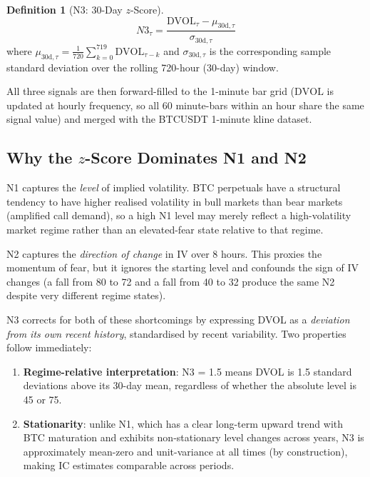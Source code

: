 \documentclass[12pt, a4paper]{article}
\theoremstyle{plain}
\theoremstyle{definition}
\newtheorem{definition}{Definition}[section]
\newcommand{\DVOL}{\mathrm{DVOL}}
\begin{document}
\begin{definition}[N3: 30-Day $z$-Score]
  \[
    N3_\tau = \frac{\DVOL_\tau - \mu_{30\mathrm{d},\tau}}
                   {\sigma_{30\mathrm{d},\tau}}
  \]
  where $\mu_{30\mathrm{d},\tau} = \frac{1}{720}\sum_{k=0}^{719}\DVOL_{\tau-k}$
  and $\sigma_{30\mathrm{d},\tau}$ is the corresponding sample standard
  deviation over the rolling 720-hour (30-day) window.
\end{definition}

All three signals are then forward-filled to the 1-minute bar grid
($\DVOL$ is updated at hourly frequency, so all 60 minute-bars within
an hour share the same signal value) and merged with the BTCUSDT 1-minute
kline dataset.

\subsection{Why the $z$-Score Dominates N1 and N2}
\label{sec:whyz}

N1 captures the \emph{level} of implied volatility. BTC perpetuals have a
structural tendency to have higher realised volatility in bull markets than
bear markets (amplified call demand), so a high N1 level may merely reflect
a high-volatility market regime rather than an elevated-fear state relative
to that regime.

N2 captures the \emph{direction of change} in IV over 8 hours. This proxies
the momentum of fear, but it ignores the starting level and confounds the
sign of IV changes (a fall from 80 to 72 and a fall from 40 to 32 produce
the same N2 despite very different regime states).

N3 corrects for both of these shortcomings by expressing DVOL as a
\emph{deviation from its own recent history}, standardised by recent
variability. Two properties follow immediately:

\begin{enumerate}[noitemsep]
  \item \textbf{Regime-relative interpretation}: N3 = 1.5 means DVOL is
        1.5 standard deviations above its 30-day mean, regardless of whether
        the absolute level is 45 or 75.
  \item \textbf{Stationarity}: unlike N1, which has a clear long-term upward
        trend with BTC maturation and exhibits non-stationary level changes
        across years, N3 is approximately mean-zero and unit-variance at all
        times (by construction), making IC estimates comparable across periods.
\end{enumerate}
\end{document}
